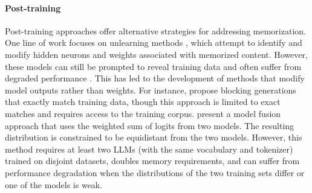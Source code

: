\paragraph{Post-training}
Post-training approaches offer alternative strategies for addressing memorization. One line of work focuses on unlearning methods \citep{maini2023can, jang2022knowledge, sakarvadia2024mitigating}, which attempt to identify and modify hidden neurons and weights associated with memorized content. However, these models can still be prompted to reveal training data \citep{shumailov2024ununlearning} and often suffer from degraded performance \citep{huang2024demystifyingverbatimmemorizationlarge}. This has led to the development of methods that modify model outputs rather than weights. For instance, \citet{ippolito2022preventing} propose blocking generations that exactly match training data, though this approach is limited to exact matches and requires access to the training corpus. \citet{abad2024copyright} present a model fusion approach that uses the weighted sum of logits from two models. The resulting distribution is constrained to be equidistant from the two models. However, this method requires at least two LLMs (with the same vocabulary and tokenizer) trained on disjoint datasets, doubles memory requirements, and can suffer from performance degradation when the distributions of the two training sets differ or one of the models is weak.